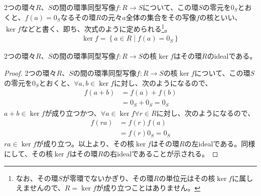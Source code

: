 \documentclass[dvipdfmx]{jsarticle}
\begin{document}
\begin{dfn}
2つの環々$R$、$S$の間の環準同型写像$f:R \rightarrow S$について、この環$S$の零元を$0_{S}$とおくと、$f(a) = 0_{S}$なるその環$R$の元々$a$全体の集合をその写像$f$の核といい、$\ker f$などと書く、即ち、次式のように定められる\footnote{なお、その環$S$が零環でないかぎり、その環$R$の単位元はその核$\ker f$に属しえませんので、$R = \ker f$が成り立つことはありません。}。
\begin{align*}
\ker f = \left\{ a \in R \middle| f(a) = 0_{S} \right\}
\end{align*}
\end{dfn}
\begin{thm}\label{3.3.2.18}
2つの環々$R$、$S$の間の環準同型写像$f:R \rightarrow S$の核$\ker f$はその環$R$のidealである。
\end{thm}
\begin{proof}
2つの環々$R$、$S$の間の環準同型写像$f:R \rightarrow S$の核$\ker f$について、この環$S$の零元を$0_{S}$とおくと、$\forall a,b \in \ker f$に対し、次のようになるので、
\begin{align*}
f(a + b) &= f(a) + f(b)\\
&= 0_{S} + 0_{S} = 0_{S}
\end{align*}
$a + b \in \ker f$が成り立つかつ、$\forall a \in \ker f\forall r \in R$に対し、次のようになるので、
\begin{align*}
f(ra) &= f(r)f(a)\\
&= f(r)0_{S} = 0_{S}
\end{align*}
$ra \in \ker f$が成り立つ。以上より、その核$\ker f$はその環$R$の左idealである。同様にして、その核$\ker f$はその環$R$の右idealであることが示される。
\end{proof}
\end{document}
